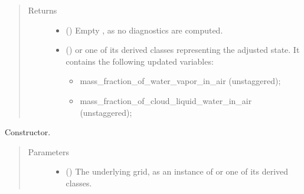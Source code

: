 \documentclass[letterpaper,10pt,english]{sphinxmanual}
\begin{document}
\begin{fulllineitems}
\begin{fulllineitems}
\begin{quote}
\begin{description}
\begin{itemize}
\end{itemize}

\item[{Returns}] \leavevmode
\begin{itemize}
\item {} 
 () \textendash{} Empty {\hyperref[\detokenize{api:tasmania.storages.grid_data.GridData}]{}}, as no diagnostics are computed.

\item {} 
 () \textendash{} {\hyperref[\detokenize{api:tasmania.storages.grid_data.GridData}]{}} or one of its derived classes representing the adjusted state.
It contains the following updated variables:
\begin{itemize}
\item {} 
mass\_fraction\_of\_water\_vapor\_in\_air (unstaggered);

\item {} 
mass\_fraction\_of\_cloud\_liquid\_water\_in\_air (unstaggered);

\end{itemize}

\end{itemize}


\end{description}\end{quote}

\end{fulllineitems}


\begin{fulllineitems}
\label{\detokenize{api:tasmania.parameterizations.adjustment_microphysics_kessler_wrf_saturation.AdjustmentMicrophysicsKesslerWRFSaturation.__init__}}
Constructor.
\begin{quote}\begin{description}
\item[{Parameters}] \leavevmode\begin{itemize}
\item {} 
 () \textendash{} The underlying grid, as an instance of {\hyperref[\detokenize{api:tasmania.grids.grid_xyz.GridXYZ}]{}} or one of its derived classes.


\end{itemize}
\end{description}
\end{quote}
\end{fulllineitems}
\end{fulllineitems}
\end{document}
